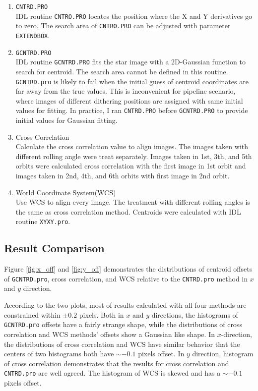 \documentclass[paper=letter, fontsize=11pt]{scrartcl} %
\numberwithin{equation}{section} %
\numberwithin{figure}{section} %
\numberwithin{table}{section} %
\begin{document}
\begin{enumerate}
\item \texttt{CNTRD.PRO}\\
  IDL routine \texttt{CNTRO.PRO} locates the position where the X
  and Y derivatives go to zero. The search area of \texttt{CNTRO.PRO}
  can be adjusted with parameter \texttt{EXTENDBOX}.\par
\item \texttt{GCNTRD.PRO}\\
  IDL routine \texttt{GCNTRD.PRO} fits the star image with a 2D-Gaussian
  function to search for centroid. The search area cannot be defined
  in this routine. \texttt{GCNTRD.pro} is likely to fail when the
  initial guess of centroid coordinates are far away from the true
  values. This is inconvenient for pipeline scenario, where images
  of different dithering positions are assigned with same initial
  values for fitting. In practice, I ran \texttt{CNTRD.PRO} before
  \texttt{GCNTRD.PRO} to provide initial values for Gaussian fitting.\par
\item Cross Correlation\\
  Calculate the cross correlation value to align images. The images
  taken with different rolling angle were treat separately. Images
  taken in 1st, 3th, and 5th orbits were calculated cross correlation
  with the first image in 1st orbit and images taken in 2nd, 4th, and
  6th orbits with first image in 2nd orbit.\par
 \item World Coordinate System(WCS)\\
   Use WCS to align every image. The treatment with different rolling
   angles is the same as cross correlation method. Centroids were
   calculated with IDL routine \texttt{XYXY.pro}.\par
\end{enumerate}

\subsection{Result Comparison}
Figure \ref{fig:x_off} and \ref{fig:y_off} demonstrates the
distributions of centroid offsets of \texttt{GCNTRD.pro}, cross
correlation, and WCS relative to the \texttt{CNTRD.pro} method in $x$
and $y$ direction. \par

According to the two plots, most of results calculated with all four
methods are constrained within $\pm 0.2$ pixels. Both in $x$ and $y$
directions, the histograms of \texttt{GCNTRD.pro} offsets have a
fairly strange shape, while the distributions of cross correlation and
WCS methods' offsets show a Gaussian like shape. In $x$-direction, the
distributions of cross correlation and WCS have similar behavior that
the centers of two histograms both have $\sim -0.1$ pixels offset. In
$y$ direction, histogram of cross correlation demonstrates that the
results for cross correlation and \texttt{CNTRD.pro} are well
agreed. The histogram of WCS is skewed and has a $\sim -0.1$ pixels
offset.\par
\end{document}
